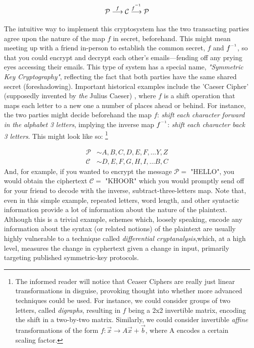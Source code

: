 \documentclass[11pt,a4paper]{article}
\newcommand{\inv}{^{\raisebox{.2em}{$\scriptscriptstyle-1$}}}
\begin{document}
$$ \mathcal{P} \overset{f}\longrightarrow \mathcal{C} \overset{f\inv}\longrightarrow \mathcal{P} $$

The intuitive way to implement this cryptosystem has the two transacting parties agree upon the nature of the map $f$ in secret, beforehand. This might mean meeting up with a friend in-person to establish the common secret, $f$ and $f\inv$, so that you could encrypt and decrypt each other's emails—fending off any prying eyes accessing their emails. This type of system has a special name, \textit{"Symmetric Key Cryptography"}, reflecting the fact that both parties have the same shared secret (foreshadowing). Important historical examples include the 'Caeser Cipher' (supposedly invented by \textit{the} Julius Caeser)%
, where $f$ is a shift operation that maps each letter to a new one a number of places ahead or behind. For instance, the two parties might decide beforehand the map $f$: \textit{shift each character forward in the alphabet 3 letters}, implying the inverse map $f\inv$: \textit{shift each character back 3 letters}. This might look like so: \footnote{The informed reader will notice that Ceaser Ciphers are really just linear transformations in disguise, provoking thought into whether more advanced techniques could be used. For instance, we could consider groups of two letters, called \textit{digraphs}, resulting in $f$ being a 2x2 invertible matrix, encoding the shift in a two-by-two matrix. Similarly, we could consider invertible \textit{affine} transformations of the form $f:\vec{x} \to A\vec{x} + \vec{b}$, where A encodes a certain scaling factor.}

\begin{align*}
 \mathcal{P} &\sim A,B,C,D,E,F,…Y,Z  \\ 
 \mathcal{C} &\sim D,E,F,G,H,I,…B,C 
\end{align*} %
And, for example, if you wanted to encrypt the message $\mathcal{P} =$ "HELLO", you would obtain the ciphertext $\mathcal{C} =$ "KHOOR" which you would promptly send off for your friend to decode with the inverse, subtract-three-letters map. Note that, even in this simple example, repeated letters, word length, and other syntactic information provide a lot of information about the nature of the plaintext. Although this is a trivial example, schemes which, loosely speaking, encode any information about the syntax (or related notions) of the plaintext are usually highly vulnerable to a technique called \textit{differential cryptanalysis},which, at a high level, measures the change in cyphertext given a change in input, primarily targeting published symmetric-key protocols.\autocite[56]{koblitz} 
\end{document}
